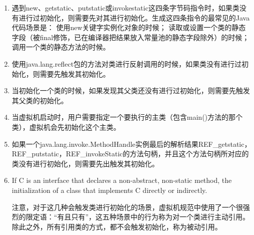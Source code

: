 \documentclass[../../../interview-questions.tex]{subfiles}
\begin{document}
\begin{enumerate}

\item{遇到new、getstatic、putstatic或invokestatic这四条字节码指令时，如果类没有进行过初始化，则需要先对其进行初始化。生成这四条指令的最常见的Java代码场景是：}
使用new关键字实例化对象的时候；
读取或设置一个类的静态字段（被final修饰，已在编译器把结果放入常量池的静态字段除外）的时候；
调用一个类的静态方法的时候。
\item{使用java.lang.reflect包的方法对类进行反射调用的时候，如果类没有进行过初始化，则需要先触发其初始化。}

\item{当初始化一个类的时候，如果发现其父类还没有进行过初始化，则需要先触发其父类的初始化。}

\item{当虚拟机启动时，用户需要指定一个要执行的主类（包含main()方法的那个类），虚拟机会先初始化这个主类。}

\item{如果一个java.lang.invoke.MethodHandle实例最后的解析结果REF\_getstatic，REF\_putstatic，REF\_invokeStatic的方法句柄，并且这个方法句柄所对应的类没有进行初始化，则需要先出触发其初始化。}

\item{If C is an interface that declares a non-abstract, non-static method, the initialization of a class that implements C directly or indirectly.} 

注意，对于这几种会触发类进行初始化的场景，虚拟机规范中使用了一个很强烈的限定语：“有且只有”，这五种场景中的行为称为对一个类进行主动引用。除此之外，所有引用类的方式，都不会触发初始化，称为被动引用。

\end{enumerate}
\end{document}
